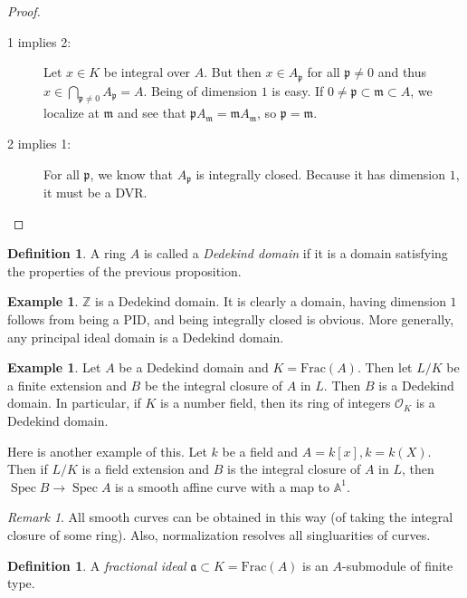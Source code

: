 \documentclass[leqno, openany]{memoir}
\theoremstyle{definition}
\newtheorem{defn}[thm]{Definition}
\newtheorem{exm}[thm]{Example}
\theoremstyle{remark}
\newtheorem{rmk}[thm]{Remark}
\theoremstyle{plain}
\theoremstyle{definition}
\theoremstyle{remark}
\newcommand{\A}{\mathbb{A}}
\newcommand{\Z}{\mathbb{Z}}
\newcommand{\mc}[1]{\mathcal{#1}}
\newcommand{\mf}[1]{\mathfrak{#1}}
\newcommand{\mr}[1]{\mathrm{#1}}
\DeclareMathOperator{\Spec}{Spec}
\begin{document}
\begin{proof}
    \begin{description}
        \item[1 implies 2:] Let $x \in K$ be integral over $A$. But then $x \in A_{\mf{p}}$ for all $\mf{p} \neq 0$ and thus $x \in \bigcap_{\mf{p} \neq 0} A_{\mf{p}} = A$. Being of dimension $1$ is easy. If $0 \neq \mf{p} \subset \mf{m} \subset A$, we localize at $\mf{m}$ and see that $\mf{p} A_{\mf{m}} = \mf{m} A_{\mf{m}}$, so $\mf{p} = \mf{m}$.
        \item[2 implies 1:] For all $\mf{p}$, we know that $A_{\mf{p}}$ is integrally closed. Because it has dimension $1$, it must be a DVR.
    \end{description}
\end{proof}

\begin{defn}
    A ring $A$ is called a \textit{Dedekind domain} if it is a domain satisfying the properties of the previous proposition. 
\end{defn}

\begin{exm}
    $\Z$ is a Dedekind domain. It is clearly a domain, having dimension $1$ follows from being a PID, and being integrally closed is obvious. More generally, any principal ideal domain is a Dedekind domain.
\end{exm}

\begin{exm}
    Let $A$ be a Dedekind domain and $K = \mr{Frac}(A)$. Then let $L/K$ be a finite extension and $B$ be the integral closure of $A$ in $L$. Then $B$ is a Dedekind domain. In particular, if $K$ is a number field, then its ring of integers $\mc{O}_K$ is a Dedekind domain.

    Here is another example of this. Let $k$ be a field and $A =  k[x], k = k(X)$. Then if $L/K$ is a field extension and $B$ is the integral closure of $A$ in $L$, then $\Spec B \to \Spec A$ is a smooth affine curve with a map to $\A^1$. 
\end{exm}

\begin{rmk}
    All smooth curves can be obtained in this way (of taking the integral closure of some ring). Also, normalization resolves all singluarities of curves.
\end{rmk}

\begin{defn}
    A \textit{fractional ideal} $\mf{a} \subset K = \mr{Frac}(A)$ is an $A$-submodule of finite type. 
\end{defn}
\end{document}
